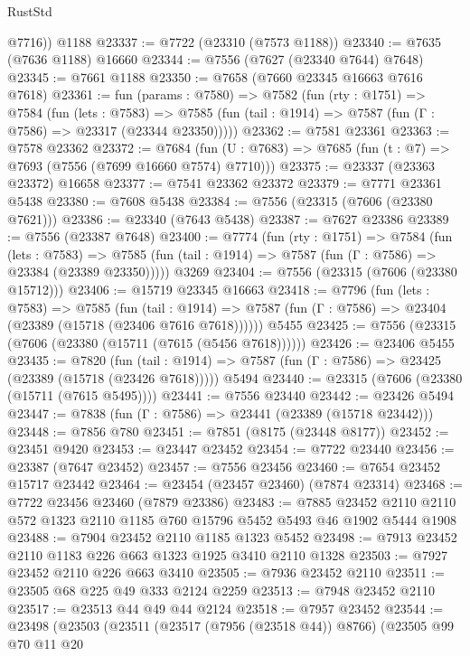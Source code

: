 \begin{lexlean}{RustStd}
\begin{coremodule}
{\begin{coremodule}
{{{{{{{{{{{{{{{{{{{{{{{{{{{{{{{{{{{{{{{{{{{        @7716))
    @1188
@23337 := @7722 (@23310 (@7573 @1188))
@23340 := @7635 (@7636 @1188) @16660
@23344 := @7556 (@7627 (@23340 @7644) @7648)
@23345 := @7661 @1188
@23350 := @7658 (@7660 @23345 @16663 @7616 @7618)
@23361 := fun (params : @7580) =>
  @7582
    (fun (rty : @1751) =>
    @7584
      (fun (lets : @7583) =>
      @7585 (fun (tail : @1914) => @7587 (fun (Γ : @7586) => @23317 (@23344 @23350)))))
@23362 := @7581 @23361
@23363 := @7578 @23362
@23372 := @7684
    (fun (U : @7683) => @7685 (fun (t : @7) => @7693 (@7556 (@7699 @16660 @7574) @7710)))
@23375 := @23337 (@23363 @23372) @16658
@23377 := @7541 @23362 @23372
@23379 := @7771 @23361 @5438
@23380 := @7608 @5438
@23384 := @7556 (@23315 (@7606 (@23380 @7621)))
@23386 := @23340 (@7643 @5438)
@23387 := @7627 @23386
@23389 := @7556 (@23387 @7648)
@23400 := @7774
    (fun (rty : @1751) =>
    @7584
      (fun (lets : @7583) =>
      @7585 (fun (tail : @1914) => @7587 (fun (Γ : @7586) => @23384 (@23389 @23350)))))
    @3269
@23404 := @7556 (@23315 (@7606 (@23380 @15712)))
@23406 := @15719 @23345 @16663
@23418 := @7796
    (fun (lets : @7583) =>
    @7585
      (fun (tail : @1914) =>
      @7587 (fun (Γ : @7586) => @23404 (@23389 (@15718 (@23406 @7616 @7618))))))
    @5455
@23425 := @7556 (@23315 (@7606 (@23380 (@15711 (@7615 (@5456 @7618))))))
@23426 := @23406 @5455
@23435 := @7820
    (fun (tail : @1914) => @7587 (fun (Γ : @7586) => @23425 (@23389 (@15718 (@23426 @7618)))))
    @5494
@23440 := @23315 (@7606 (@23380 (@15711 (@7615 @5495))))
@23441 := @7556 @23440
@23442 := @23426 @5494
@23447 := @7838 (fun (Γ : @7586) => @23441 (@23389 (@15718 @23442)))
@23448 := @7856 @780
@23451 := @7851 (@8175 (@23448 @8177))
@23452 := @23451 @9420
@23453 := @23447 @23452
@23454 := @7722 @23440
@23456 := @23387 (@7647 @23452)
@23457 := @7556 @23456
@23460 := @7654 @23452 @15717 @23442
@23464 := @23454 (@23457 @23460) (@7874 @23314)
@23468 := @7722 @23456 @23460 (@7879 @23386)
@23483 := @7885
    @23452
    @2110
    @2110
    @572
    @1323
    @2110
    @1185
    @760
    @15796
    @5452
    @5493
    @46
    @1902
    @5444
    @1908
@23488 := @7904 @23452 @2110 @1185 @1323 @5452
@23498 := @7913 @23452 @2110 @1183 @226 @663 @1323 @1925 @3410 @2110 @1328
@23503 := @7927 @23452 @2110 @226 @663 @3410
@23505 := @7936 @23452 @2110
@23511 := @23505 @68 @225 @49 @333 @2124 @2259
@23513 := @7948 @23452 @2110
@23517 := @23513 @44 @49 @44 @2124
@23518 := @7957 @23452
@23544 := @23498
    (@23503
      (@23511
        (@23517 (@7956 (@23518 @44)) @8766)
        (@23505
          @99
          @70
          @11
          @20
}}}}}}}}}}}}}}}}}}}}}}}}}}}}}}}}}}}}}}}}}}}
\end{coremodule}}
\end{coremodule}
\end{lexlean}
